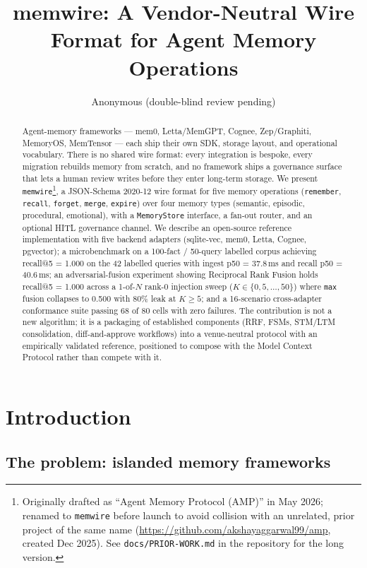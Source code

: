 \documentclass[11pt,letterpaper,twocolumn]{article}
\title{memwire: A Vendor-Neutral Wire Format for Agent Memory Operations}
\author{Anonymous (double-blind review pending)}
\date{}
\begin{document}
\maketitle

\begin{abstract}
Agent-memory frameworks --- mem0, Letta/MemGPT, Cognee, Zep/Graphiti, MemoryOS, MemTensor --- each ship their own SDK, storage layout, and operational vocabulary. There is no shared wire format: every integration is bespoke, every migration rebuilds memory from scratch, and no framework ships a governance surface that lets a human review writes before they enter long-term storage. We present \texttt{memwire}\footnote{Originally drafted as ``Agent Memory Protocol (AMP)'' in May 2026; renamed to \texttt{memwire} before launch to avoid collision with an unrelated, prior project of the same name (\url{https://github.com/akshayaggarwal99/amp}, created Dec 2025). See \texttt{docs/PRIOR-WORK.md} in the repository for the long version.}, a JSON-Schema 2020-12 wire format for five memory operations (\texttt{remember}, \texttt{recall}, \texttt{forget}, \texttt{merge}, \texttt{expire}) over four memory types (semantic, episodic, procedural, emotional), with a \texttt{MemoryStore} interface, a fan-out router, and an optional HITL governance channel. We describe an open-source reference implementation with five backend adapters (sqlite-vec, mem0, Letta, Cognee, pgvector); a microbenchmark on a 100-fact / 50-query labelled corpus achieving recall@5 = 1.000 on the 42 labelled queries with ingest p50 = 37.8\,ms and recall p50 = 40.6\,ms; an adversarial-fusion experiment showing Reciprocal Rank Fusion holds recall@5 = 1.000 across a 1-of-$N$ rank-0 injection sweep ($K \in \{0,5,\dots,50\}$) where \texttt{max} fusion collapses to 0.500 with 80\% leak at $K \geq 5$; and a 16-scenario cross-adapter conformance suite passing 68 of 80 cells with zero failures. The contribution is not a new algorithm; it is a packaging of established components (RRF, FSMs, STM/LTM consolidation, diff-and-approve workflows) into a venue-neutral protocol with an empirically validated reference, positioned to compose with the Model Context Protocol rather than compete with it.
\end{abstract}

\section{Introduction}
\label{sec:intro}

\subsection{The problem: islanded memory frameworks}
\label{sec:intro-problem}
\end{document}
